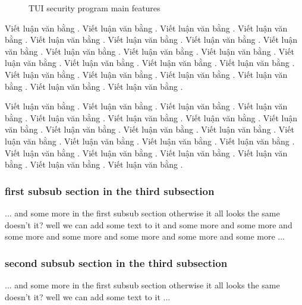 \begin{figure}
{   \label{fig:tui-get-phone-info-controls}}
\label{myfigure}
\caption{TUI security program main features}
\end{figure}

Viết luận văn bằng  . Viết luận văn bằng  . Viết luận văn bằng  . Viết luận văn bằng  . Viết luận văn bằng  . Viết luận văn bằng  . Viết luận văn bằng  . Viết luận văn bằng  . Viết luận văn bằng  . Viết luận văn bằng  . Viết luận văn bằng  . Viết luận văn bằng  . Viết luận văn bằng  . Viết luận văn bằng  . Viết luận văn bằng  . Viết luận văn bằng  . Viết luận văn bằng  . Viết luận văn bằng  . Viết luận văn bằng  . Viết luận văn bằng  . Viết luận văn bằng  . 

Viết luận văn bằng  . Viết luận văn bằng  . Viết luận văn bằng  . Viết luận văn bằng  . Viết luận văn bằng  . Viết luận văn bằng  . Viết luận văn bằng  . Viết luận văn bằng  . Viết luận văn bằng  . Viết luận văn bằng  . Viết luận văn bằng  . Viết luận văn bằng  . Viết luận văn bằng  . Viết luận văn bằng  . Viết luận văn bằng  . Viết luận văn bằng  . Viết luận văn bằng  . Viết luận văn bằng  . Viết luận văn bằng  . Viết luận văn bằng  . Viết luận văn bằng  . 


 
\subsubsection{first subsub section in the third subsection}
... and some more in the first subsub section otherwise it all looks the same
doesn't it? well we can add some text to it and some more and some more and
some more and some more and some more and some more and some more ...

\subsubsection{second subsub section in the third subsection}
... and some more in the first subsub section otherwise it all looks the same
doesn't it? well we can add some text to it ...

